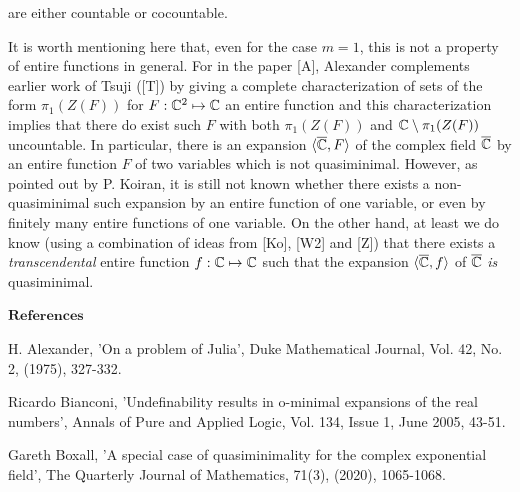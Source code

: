 \documentclass[12pt,nodate]{article}
\begin{document}
 \vspace{2mm}
 
 \noindent
 are either countable or cocountable. 
 
 It is worth mentioning here that, even for the case $m=1$, this is not a property of entire functions in general. For in the paper [A], Alexander complements  earlier work of Tsuji  ([T]) by giving a complete characterization of sets of the form $\pi_1(Z(F))$ for $F: \mathbb{C}^2 \mapsto \mathbb{C}$ an entire function and this characterization implies that there do exist such $F$ with both  $\pi_1(Z(F))$ and $\mathbb{C} \setminus \pi_1(Z(F))$ uncountable. In particular, there is an expansion $\langle \overline{\mathbb{C}}, F \rangle$ of the complex field  $\overline{\mathbb{C}}$ by an entire function $F$ of two variables which is not quasiminimal. However, as pointed out by P. Koiran, it is still not known whether there exists a non-quasiminimal such expansion by an entire function of one variable, or even by finitely many entire functions of one variable. On the other hand, at least we do know (using a combination of ideas from [Ko], [W2] and [Z]) that there exists a \emph{transcendental} entire function $f:\mathbb{C} \mapsto \mathbb{C}$ such that the expansion $\langle \overline{\mathbb{C}}, f \rangle$ of $\overline{\mathbb{C}}$ \emph{is} quasiminimal.
 
 
 
 
 
 \vspace{5mm}
 
 \hspace{50mm} $\mathbf{References}$
 
 \vspace{1mm}
 
 \noindent
 [A] H. Alexander, 'On a problem of Julia', Duke Mathematical Journal, Vol. 42, No. 2, (1975), 327-332.
 
 \vspace{1mm}
 
 
 \noindent
 [B] Ricardo Bianconi, 'Undefinability results in o-minimal expansions of the real numbers', Annals of Pure and Applied Logic, Vol. 134, Issue 1, June 2005, 43-51.
 
 \vspace{1mm}
 
 \noindent
 [Bo] Gareth Boxall, 'A special case of quasiminimality for the complex exponential field', The Quarterly Journal of Mathematics, 71(3), (2020), 1065-1068.

    
 \vspace{1mm}   
 
\end{document}
